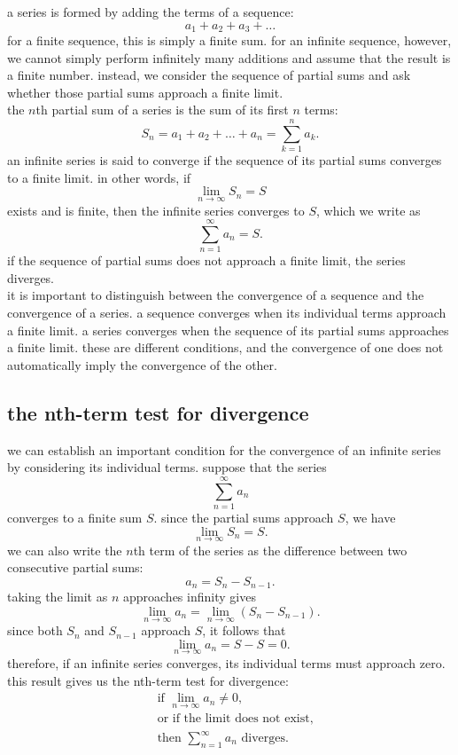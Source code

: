 \documentclass{article}
\begin{document}
a series is formed by adding the terms of a sequence:
\[
a_1+a_2+a_3+\ldots
\]
for a finite sequence, this is simply a finite sum. for an infinite sequence, however, we cannot simply perform infinitely many additions and assume that the result is a finite number. instead, we consider the sequence of partial sums and ask whether those partial sums approach a finite limit.\\

the $n$th partial sum of a series is the sum of its first $n$ terms:
\[
S_n=a_1+a_2+\ldots+a_n
=\sum_{k=1}^{n}a_k.
\]
an infinite series is said to converge if the sequence of its partial sums converges to a finite limit. in other words, if
\[
\lim_{n\to\infty}S_n=S
\]
exists and is finite, then the infinite series converges to $S$, which we write as
\[
\sum_{n=1}^{\infty}a_n=S.
\]
if the sequence of partial sums does not approach a finite limit, the series diverges.\\

it is important to distinguish between the convergence of a sequence and the convergence of a series. a sequence converges when its individual terms approach a finite limit. a series converges when the sequence of its partial sums approaches a finite limit. these are different conditions, and the convergence of one does not automatically imply the convergence of the other.\\

\subsection{the nth-term test for divergence}

we can establish an important condition for the convergence of an infinite series by considering its individual terms. suppose that the series
\[
\sum_{n=1}^{\infty}a_n
\]
converges to a finite sum $S$. since the partial sums approach $S$, we have
\[
\lim_{n\to\infty}S_n=S.
\]
we can also write the $n$th term of the series as the difference between two consecutive partial sums:
\[
a_n=S_n-S_{n-1}.
\]
taking the limit as $n$ approaches infinity gives
\[
\lim_{n\to\infty}a_n
=
\lim_{n\to\infty}(S_n-S_{n-1}).
\]
since both $S_n$ and $S_{n-1}$ approach $S$, it follows that
\[
\lim_{n\to\infty}a_n=S-S=0.
\]
therefore, if an infinite series converges, its individual terms must approach zero.\\

this result gives us the nth-term test for divergence:
\[
\boxed{
\begin{aligned}
&\text{if } \lim_{n\to\infty}a_n\neq 0,\\
&\text{or if the limit does not exist,}\\
&\text{then } \sum_{n=1}^{\infty}a_n
\text{ diverges.}
\end{aligned}
}
\]
\end{document}
